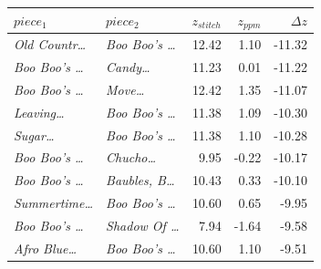 \begin{tabular}{llrrr}
\toprule
$piece_1$ & $piece_2$ & $z_{stitch}$ & $z_{ppm}$ & $\Delta z$ \\
\midrule
\textit{Old Countr\dots} & \textit{Boo Boo's \dots} & 12.42 & 1.10 & -11.32 \\
\textit{Boo Boo's \dots} & \textit{Candy\dots} & 11.23 & 0.01 & -11.22 \\
\textit{Boo Boo's \dots} & \textit{Move\dots} & 12.42 & 1.35 & -11.07 \\
\textit{Leaving\dots} & \textit{Boo Boo's \dots} & 11.38 & 1.09 & -10.30 \\
\textit{Sugar\dots} & \textit{Boo Boo's \dots} & 11.38 & 1.10 & -10.28 \\
\textit{Boo Boo's \dots} & \textit{Chucho\dots} & 9.95 & -0.22 & -10.17 \\
\textit{Boo Boo's \dots} & \textit{Baubles, B\dots} & 10.43 & 0.33 & -10.10 \\
\textit{Summertime\dots} & \textit{Boo Boo's \dots} & 10.60 & 0.65 & -9.95 \\
\textit{Boo Boo's \dots} & \textit{Shadow Of \dots} & 7.94 & -1.64 & -9.58 \\
\textit{Afro Blue\dots} & \textit{Boo Boo's \dots} & 10.60 & 1.10 & -9.51 \\
\bottomrule
\end{tabular}
